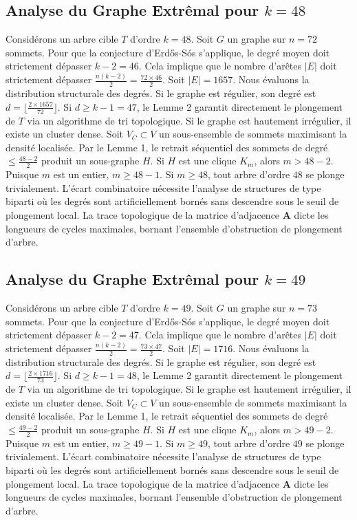 \documentclass[11pt,a4paper]{article}
\begin{document}
\subsection{Analyse du Graphe Extr\^emal pour $k=48$}
Consid\'erons un arbre cible $T$ d'ordre $k=48$.
Soit $G$ un graphe sur $n=72$ sommets.
Pour que la conjecture d'Erd\H{o}s-S\'os s'applique, le degr\'e moyen doit strictement d\'epasser $k-2 = 46$.
Cela implique que le nombre d'ar\^etes $|E|$ doit strictement d\'epasser $\frac{n(k-2)}{2} = \frac{72 \times 46}{2}$.
Soit $|E| = 1657$.
Nous \'evaluons la distribution structurale des degr\'es. Si le graphe est r\'egulier, son degr\'e est $d = \lfloor \frac{2 \times 1657}{72} \rfloor$.
Si $d \geq k-1 = 47$, le Lemme 2 garantit directement le plongement de $T$ via un algorithme de tri topologique.
Si le graphe est hautement irr\'egulier, il existe un cluster dense. Soit $V_C \subset V$ un sous-ensemble de sommets maximisant la densit\'e localis\'ee.
Par le Lemme 1, le retrait s\'equentiel des sommets de degr\'e $\leq \frac{48-2}{2}$ produit un sous-graphe $H$.
Si $H$ est une clique $K_{m}$, alors $m > 48-2$. Puisque $m$ est un entier, $m \geq 48-1$. Si $m \geq 48$, tout arbre d'ordre $48$ se plonge trivialement.
L'\'ecart combinatoire n\'ecessite l'analyse de structures de type biparti o\`u les degr\'es sont artificiellement born\'es sans descendre sous le seuil de plongement local. La trace topologique de la matrice d'adjacence $\mathbf{A}$ dicte les longueurs de cycles maximales, bornant l'ensemble d'obstruction de plongement d'arbre.


\subsection{Analyse du Graphe Extr\^emal pour $k=49$}
Consid\'erons un arbre cible $T$ d'ordre $k=49$.
Soit $G$ un graphe sur $n=73$ sommets.
Pour que la conjecture d'Erd\H{o}s-S\'os s'applique, le degr\'e moyen doit strictement d\'epasser $k-2 = 47$.
Cela implique que le nombre d'ar\^etes $|E|$ doit strictement d\'epasser $\frac{n(k-2)}{2} = \frac{73 \times 47}{2}$.
Soit $|E| = 1716$.
Nous \'evaluons la distribution structurale des degr\'es. Si le graphe est r\'egulier, son degr\'e est $d = \lfloor \frac{2 \times 1716}{73} \rfloor$.
Si $d \geq k-1 = 48$, le Lemme 2 garantit directement le plongement de $T$ via un algorithme de tri topologique.
Si le graphe est hautement irr\'egulier, il existe un cluster dense. Soit $V_C \subset V$ un sous-ensemble de sommets maximisant la densit\'e localis\'ee.
Par le Lemme 1, le retrait s\'equentiel des sommets de degr\'e $\leq \frac{49-2}{2}$ produit un sous-graphe $H$.
Si $H$ est une clique $K_{m}$, alors $m > 49-2$. Puisque $m$ est un entier, $m \geq 49-1$. Si $m \geq 49$, tout arbre d'ordre $49$ se plonge trivialement.
L'\'ecart combinatoire n\'ecessite l'analyse de structures de type biparti o\`u les degr\'es sont artificiellement born\'es sans descendre sous le seuil de plongement local. La trace topologique de la matrice d'adjacence $\mathbf{A}$ dicte les longueurs de cycles maximales, bornant l'ensemble d'obstruction de plongement d'arbre.
\end{document}
